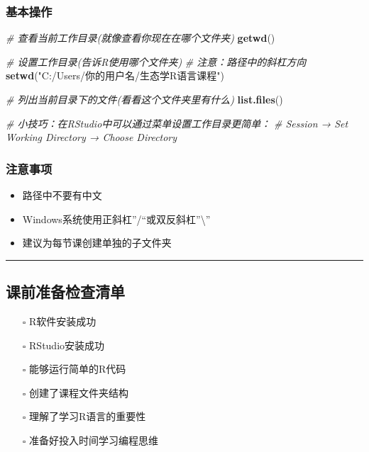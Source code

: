 \documentclass[
]{book}
\newenvironment{Shaded}{\begin{snugshade}}{\end{snugshade}}
\newcommand{\CommentTok}[1]{\textcolor[rgb]{0.56,0.35,0.01}{\textit{#1}}}
\newcommand{\FunctionTok}[1]{\textcolor[rgb]{0.13,0.29,0.53}{\textbf{#1}}}
\newcommand{\NormalTok}[1]{#1}
\newcommand{\StringTok}[1]{\textcolor[rgb]{0.31,0.60,0.02}{#1}}
\providecommand{\tightlist}{%
  \setlength{\itemsep}{0pt}\setlength{\parskip}{0pt}}
\begin{document}
\hypertarget{ux57faux672cux64cdux4f5c}{%
\subsubsection{基本操作}\label{ux57faux672cux64cdux4f5c}}

\begin{Shaded}
\begin{Highlighting}[]
\CommentTok{\# 查看当前工作目录(就像查看你现在在哪个文件夹)}
\FunctionTok{getwd}\NormalTok{()}

\CommentTok{\# 设置工作目录(告诉R使用哪个文件夹)}
\CommentTok{\# 注意：路径中的斜杠方向}
\FunctionTok{setwd}\NormalTok{(}\StringTok{"C:/Users/你的用户名/生态学R语言课程"}\NormalTok{) }

\CommentTok{\# 列出当前目录下的文件(看看这个文件夹里有什么)}
\FunctionTok{list.files}\NormalTok{()}

\CommentTok{\# 小技巧：在RStudio中可以通过菜单设置工作目录更简单：}
\CommentTok{\# Session → Set Working Directory → Choose Directory}
\end{Highlighting}
\end{Shaded}

\hypertarget{ux6ce8ux610fux4e8bux9879}{%
\subsubsection{注意事项}\label{ux6ce8ux610fux4e8bux9879}}

\begin{itemize}
\tightlist
\item
  路径中不要有中文
\item
  Windows系统使用正斜杠''/``或双反斜杠''\textbackslash''
\item
  建议为每节课创建单独的子文件夹
\end{itemize}

\begin{center}\rule{0.5\linewidth}{0.5pt}\end{center}

\hypertarget{ux8bfeux524dux51c6ux5907ux68c0ux67e5ux6e05ux5355}{%
\subsection{课前准备检查清单}\label{ux8bfeux524dux51c6ux5907ux68c0ux67e5ux6e05ux5355}}

\begin{itemize}
\tightlist
\item[$\square$]
  R软件安装成功
\item[$\square$]
  RStudio安装成功\\
\item[$\square$]
  能够运行简单的R代码
\item[$\square$]
  创建了课程文件夹结构
\item[$\square$]
  理解了学习R语言的重要性
\item[$\square$]
  准备好投入时间学习编程思维
\end{itemize}
\end{document}

